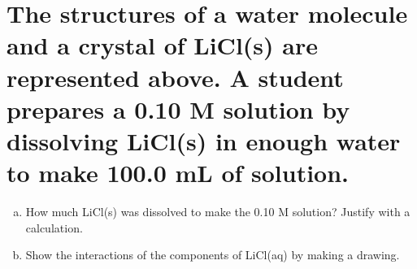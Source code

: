 \documentclass[11pt]{article}
\begin{document}
\section{The structures of a water molecule and a crystal of LiCl(s) are represented above. A student prepares a 0.10 M solution by dissolving LiCl(s) in enough water to make 100.0 mL of solution.}
\label{sec:org0f0f405}
\begin{enumerate}[(a)]
\item How much LiCl(s) was dissolved to make the 0.10 M solution? Justify with a
calculation.
\item Show the interactions of the components of LiCl(aq) by making a drawing.
\end{enumerate}
\end{document}
